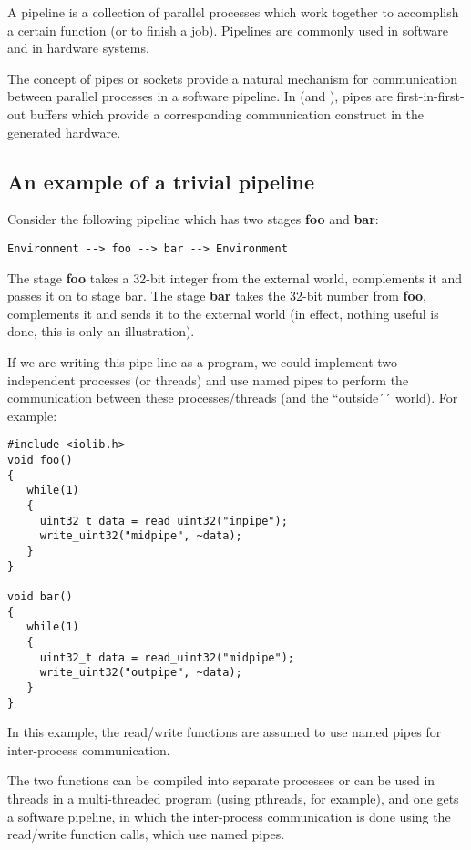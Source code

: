 A pipeline is a collection of parallel processes which
work together to accomplish a certain function (or to finish
a job).   Pipelines are commonly used in software and
in hardware systems.

The concept of pipes or sockets provide a natural mechanism
for communication between parallel processes in a software
pipeline.  In \Aa (and \vC), pipes are first-in-first-out
buffers which provide a corresponding communication construct
in the generated hardware.

\subsection{An example of a trivial pipeline}


Consider the following pipeline which has two stages
{\bf foo} and {\bf bar}:  
\begin{verbatim}
Environment --> foo --> bar --> Environment
\end{verbatim}
The stage {\bf foo} takes a 32-bit
integer from the external world, complements it and passes it on to stage
bar.  The stage {\bf bar} takes the 32-bit number from {\bf foo}, complements
it and sends it to the external world (in effect, nothing useful
is done, this is only an illustration).

If we are writing this pipe-line as a program, we could implement
two independent processes (or threads) and use named pipes to
perform the communication between these processes/threads (and the
``outside´´ world).  For example:
\begin{verbatim}
#include <iolib.h>
void foo()
{
   while(1)
   {
     uint32_t data = read_uint32("inpipe");
     write_uint32("midpipe", ~data);
   }
}

void bar()
{
   while(1)
   {
     uint32_t data = read_uint32("midpipe");
     write_uint32("outpipe", ~data);
   }
}
\end{verbatim}
In this example, the read/write functions are assumed
to use named pipes for inter-process communication.

The two functions can be compiled into separate processes
or can be used in threads in a multi-threaded program (using pthreads, for
example), and one gets a software pipeline, in which
the inter-process communication is done using the
read/write function calls, which use named pipes.

